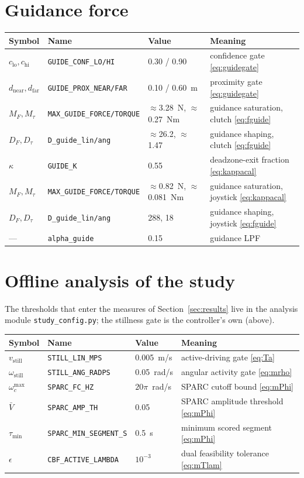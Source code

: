 \section{Guidance force}
\begin{tabularx}{\linewidth}{@{}l>{\scriptsize}ll>{\raggedright\arraybackslash}X@{}}
\toprule
Symbol & Name & Value & Meaning \\
\midrule
$c_{\text{lo}}, c_{\text{hi}}$ & \texttt{GUIDE\_CONF\_LO/HI} & 0.30 / 0.90 & confidence gate \eqref{eq:guidegate} \\
$d_{\text{near}}, d_{\text{far}}$ & \texttt{GUIDE\_PROX\_NEAR/FAR} & 0.10 / 0.60~m & proximity gate \eqref{eq:guidegate} \\
$M_F, M_\tau$ & \texttt{MAX\_GUIDE\_FORCE/TORQUE} & $\approx$3.28~N, $\approx$0.27~Nm & guidance saturation, clutch \eqref{eq:fguide} \\
$D_F, D_\tau$ & \texttt{D\_guide\_lin/ang} & $\approx$26.2, $\approx$1.47 & guidance shaping, clutch \eqref{eq:fguide} \\
$\kappa$ & \texttt{GUIDE\_K} & 0.55 & deadzone-exit fraction \eqref{eq:kappacal} \\
$M_F, M_\tau$ & \texttt{MAX\_GUIDE\_FORCE/TORQUE} & $\approx$0.82~N, $\approx$0.081~Nm & guidance saturation, joystick \eqref{eq:kappacal} \\
$D_F, D_\tau$ & \texttt{D\_guide\_lin/ang} & 288, 18 & guidance shaping, joystick \eqref{eq:fguide} \\
--- & \texttt{alpha\_guide} & 0.15 & guidance LPF \\
\bottomrule
\end{tabularx}

\section{Offline analysis of the study}
The thresholds that enter the measures of Section~\ref{sec:results} live in the analysis module \texttt{study\_\allowbreak config.py}; the stillness gate is the controller's own (above).

\noindent\begin{tabularx}{\linewidth}{@{}l>{\scriptsize}ll>{\raggedright\arraybackslash}X@{}}
\toprule
Symbol & Name & Value & Meaning \\
\midrule
$v_{\text{still}}$ & \texttt{STILL\_LIN\_MPS} & 0.005~m/s & active-driving gate \eqref{eq:Ta} \\
$\omega_{\text{still}}$ & \texttt{STILL\_ANG\_RADPS} & 0.05~rad/s & angular activity gate \eqref{eq:mrho} \\
$\omega_c^{\max}$ & \texttt{SPARC\_FC\_HZ} & $20\pi$~rad/s & SPARC cutoff bound \eqref{eq:mPhi} \\
$\bar{V}$ & \texttt{SPARC\_AMP\_TH} & 0.05 & SPARC amplitude threshold \eqref{eq:mPhi} \\
$\tau_{\min}$ & \texttt{SPARC\_MIN\_SEGMENT\_S} & 0.5~s & minimum scored segment \eqref{eq:mPhi} \\
$\epsilon$ & \texttt{CBF\_ACTIVE\_LAMBDA} & $10^{-3}$ & dual feasibility tolerance \eqref{eq:mTlam} \\
\bottomrule
\end{tabularx}

